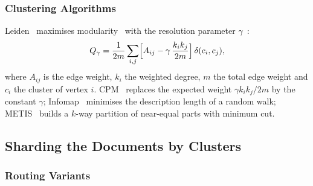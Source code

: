 \documentclass[11pt, a4paper]{article}
\newif\ifdraftnotes
\newcommand{\todo}[1]{\ifdraftnotes\par\noindent{\small\color{red!75!black}\textbf{TODO:} #1}\par\fi}
\newcommand{\strategy}[1]{\texttt{#1}}
\begin{document}
\todo{Text: why four algorithms (interchangeable components under one budget), the main configuration ($\gamma=1$ for Leiden, $\gamma=0.02$ for CPM, $k=341$ for METIS, seed 42, up to 200 passes to convergence). Materials: Table~\ref{tab:clusterings} is given in Section~4.4.}

\subsubsection{Clustering Algorithms}
Leiden~\cite{traag2019} maximises modularity~\cite{newman2004} with the resolution parameter $\gamma$~\cite{reichardt2006}:
\begin{equation}
	Q_\gamma=\frac{1}{2m}\sum_{i,j}\Bigl[A_{ij}-\gamma\,\frac{k_i k_j}{2m}\Bigr]\,\delta(c_i,c_j),
	\label{eq:modularity}
\end{equation}
where $A_{ij}$ is the edge weight, $k_i$ the weighted degree, $m$ the total edge weight and $c_i$ the cluster of vertex $i$.
CPM~\cite{traag2011} replaces the expected weight $\gamma k_ik_j/2m$ by the constant $\gamma$; Infomap~\cite{rosvall2008} minimises the description length of a random walk; METIS~\cite{karypis1998} builds a $k$-way partition of near-equal parts with minimum cut.

\subsection{Sharding the Documents by Clusters}

\todo{Text: a cluster becomes a shard and a document is stored in every shard of its terms (Eq.~\eqref{eq:assignment}); the graph covers only \graphVocabularyShare\,\% of the vocabulary, so the strategies differ in the assignment of out-of-graph terms, replication and the budget. Materials: none.}

\subsubsection{Routing Variants}
\label{sec:affinity}

\todo{Text: \strategy{base}~--- out-of-graph terms hashed into a separate shard range; \strategy{aff}~--- the document vote under the $G^2$ criterion (Eq.~\eqref{eq:vote}), hashing only for orphan terms; replicas \strategy{base\_r$k$}, \strategy{aff\_r$k$} (Eq.~\eqref{eq:affinity}); \strategy{hash\_*}~--- random partitions with the same number of shards. Materials: none; the strategies are summarised in Table~\ref{tab:strategies} (Section~5.3).}
\end{document}

